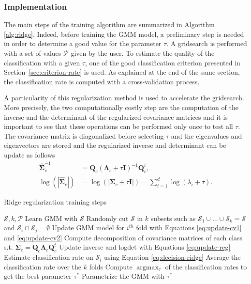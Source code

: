 \documentclass[a4paper,11pt,DIV=16,abstracton]{scrartcl}
\begin{document}
        \subsubsection{Implementation}

        The main steps of the training algorithm are summarized in Algorithm \ref{alg:ridge}. Indeed, before training the GMM model, a preliminary step is needed in order to determine a good value for the parameter $\tau$. A gridsearch is performed with a set of values $\mathcal{P}$ given by the user. To estimate the quality of the classification with a given $\tau$, one of the good classification criterion presented in Section~\ref{sec:criterion-rate} is used. As explained at the end of the same section, the classification rate is computed with a cross-validation process.

        A particularity of this regularization method is used to accelerate the gridsearch. More precisely, the two computationally costly step are the computation of the inverse and the determinant of the regularized covariance matrices and it is important to see that these operations can be performed only once to test all $\tau$. The covariance matrix is diagonalized before selecting $\tau$ and the eigenvalues and eigenvectors are stored and the regularized inverse and determinant can be update as follows
        \begin{align}
            \hat{\boldsymbol{\Sigma}}_c^{-1} &= \mathbf{Q}_c (\boldsymbol{\Lambda}_c + \tau \mathbf{I})^{-1} \mathbf{Q}_c^t, \nonumber\\
            \log (|\hat{\boldsymbol{\Sigma}}_c|) &= \log (|\boldsymbol{\Sigma}_c + \tau \mathbf{I}|) = \sum_{i=1}^{d} \log (\lambda_i + \tau).
            \label{eq:update-reg}
        \end{align}

        \begin{algorithm}
        \caption{Ridge regularization training steps\label{alg:ridge}}
        \begin{algorithmic}[1]
        \REQUIRE $\mathcal{S},k,\mathcal{P}$
        \STATE Learn GMM with $\mathcal{S}$
        \STATE Randomly cut $\mathcal{S}$ in $k$ subsets such as $\mathcal{S}_1 \cup \text{...} \cup \mathcal{S}_k = \mathcal{S}$ and $\mathcal{S}_i \cap \mathcal{S}_j = \emptyset$
        \STATE Update GMM model for $i^{th}$ fold with Equations \ref{eq:update-cv1} and \ref{eq:update-cv2}
        \STATE Compute decomposition of covariance matrices of each class s.t. $\boldsymbol{\Sigma}_c = \mathbf{Q}_c \boldsymbol{\Lambda}_c \mathbf{Q}_c^t$
        \STATE Update inverse and logdet with Equations \ref{eq:update-reg}
        \STATE Estimate classification rate on $\mathcal{S}_i$ using Equation \ref{eq:decision-ridge}
        \ENDFOR
        \ENDFOR
        \STATE Average the classification rate over the $k$ folds
        \STATE Compute $\text{arg} \max_{\tau}$ of the classification rates to get the best parameter $\tau^*$
        \STATE Parametrize the GMM with $\tau^*$
        \end{algorithmic}
        \end{algorithm}
\end{document}
